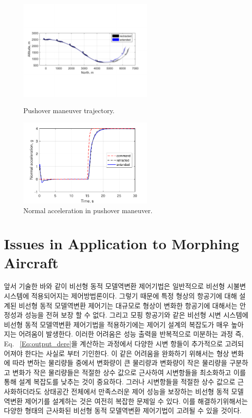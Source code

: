 \documentclass[a4paper, 12pt]{report}
\begin{document}
	\begin{figure}[!t]
		\centering
		\includegraphics[width=0.6\textwidth]{./resources/pdf/pushover_trj.pdf}
		\caption{Pushover maneuver trajectory.}
		\label{fig:pushover_trj}
		\centering
		\includegraphics[width=0.6\textwidth]{./resources/pdf/pushover.pdf}
		\caption{Normal acceleration in pushover maneuver.}
		\label{fig:pushover}
	\end{figure}
	
	\section{Issues in Application to Morphing Aircraft}
	
	앞서 기술한 바와 같이 비선형 동적 모델역변환 제어기법은 일반적으로 비선형 시불변 시스템에 적용되어지는 제어방법론이다. 그렇기 때문에 특정 형상의 항공기에 대해 설계된 비선형 동적 모델역변환 제어기는 대규모로 형상이 변화한 항공기에 대해서는 안정성과 성능을 전혀 보장 할 수 없다. 그리고 모핑 항공기와 같은 비선형 시변 시스템에 비선형 동적 모델역변환 제어기법을 적용하기에는 제어기 설계의 복잡도가 매우 높아지는 어려움이 발생한다. 이러한 어려움은 성능 출력을 반복적으로 미분하는 과정 즉, Eq.~ \eqref{Eq:output_dere}을 계산하는 과정에서 다양한 시변 항들이 추가적으로 고려되어져야 한다는 사실로 부터 기인한다. 이 같은 어려움을 완화하기 위해서는 형상 변화에 따라 변하는 물리량들 중에서 변화량이 큰 물리량과 변화량이 작은 물리량을 구분하고 변화가 작은 물리량들은 적절한 상수 값으로 근사하여 시변항들을 최소화하고 이를 통해 설계 복잡도를 낮추는 것이 중요하다. 그러나 시변항들을 적절한 상수 값으로 근사화하더라도 상태공간 전체에서 만족스러운 제어 성능을 보장하는 비선형 동적 모델역변환 제어기를 설계하는 것은 여전히 복잡한 문제일 수 있다. 이를 해결하기위해서는 다양한 형태의 근사화된 비선형 동적 모델역변환 제어기법이 고려될 수 있을 것이다.
	
\end{document}
